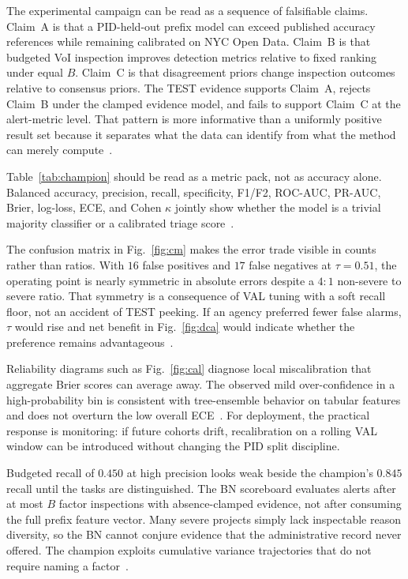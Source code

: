 The experimental campaign can be read as a sequence of falsifiable claims. Claim~A is that a PID-held-out prefix model can exceed published accuracy references while remaining calibrated on NYC Open Data. Claim~B is that budgeted VoI inspection improves detection metrics relative to fixed ranking under equal $B$. Claim~C is that disagreement priors change inspection outcomes relative to consensus priors. The TEST evidence supports Claim~A, rejects Claim~B under the clamped evidence model, and fails to support Claim~C at the alert-metric level. That pattern is more informative than a uniformly positive result set because it separates what the data can identify from what the method can merely compute~\cite{Song2021,Memarzadeh2016,Egwim2021}.

Table~\ref{tab:champion} should be read as a metric pack, not as accuracy alone. Balanced accuracy, precision, recall, specificity, F1/F2, ROC-AUC, PR-AUC, Brier, log-loss, ECE, and Cohen $\kappa$ jointly show whether the model is a trivial majority classifier or a calibrated triage score~\cite{Saito2015,Gneiting2007,Cohen1960,Hand2009}.

The confusion matrix in Fig.~\ref{fig:cm} makes the error trade visible in counts rather than ratios. With $16$ false positives and $17$ false negatives at $\tau{=}0.51$, the operating point is nearly symmetric in absolute errors despite a $4{:}1$ non-severe to severe ratio. That symmetry is a consequence of VAL tuning with a soft recall floor, not an accident of TEST peeking. If an agency preferred fewer false alarms, $\tau$ would rise and net benefit in Fig.~\ref{fig:dca} would indicate whether the preference remains advantageous~\cite{Vickers2006}.

Reliability diagrams such as Fig.~\ref{fig:cal} diagnose local miscalibration that aggregate Brier scores can average away. The observed mild over-confidence in a high-probability bin is consistent with tree-ensemble behavior on tabular features and does not overturn the low overall ECE~\cite{Murphy1973,Gneiting2007}. For deployment, the practical response is monitoring: if future cohorts drift, recalibration on a rolling VAL window can be introduced without changing the PID split discipline.

Budgeted recall of $0.450$ at high precision looks weak beside the champion's $0.845$ recall until the tasks are distinguished. The BN scoreboard evaluates alerts after at most $B$ factor inspections with absence-clamped evidence, not after consuming the full prefix feature vector. Many severe projects simply lack inspectable reason diversity, so the BN cannot conjure evidence that the administrative record never offered. The champion exploits cumulative variance trajectories that do not require naming a factor~\cite{Luu2009,Tagharobi2025}.

